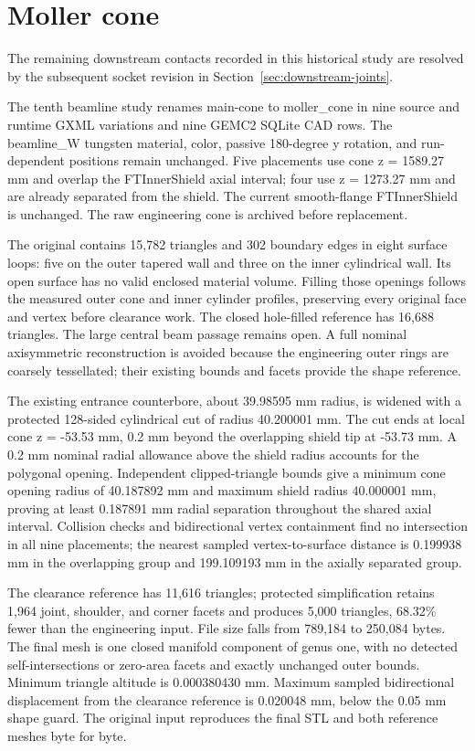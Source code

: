 \FloatBarrier
\section{Moller cone}
\label{sec:moller-cone}

The remaining downstream contacts recorded in this historical study are resolved by the subsequent socket
revision in Section~\ref{sec:downstream-joints}.

The tenth beamline study renames main-cone to moller\_cone in nine source and runtime GXML variations and
nine GEMC2 SQLite CAD rows. The beamline\_W tungsten material, color, passive 180-degree y rotation, and
run-dependent positions remain unchanged. Five placements use cone z = 1589.27 mm and overlap the
FTInnerShield axial interval; four use z = 1273.27 mm and are already separated from the shield. The current
smooth-flange FTInnerShield is unchanged. The raw engineering cone is archived before replacement.

The original contains 15,782 triangles and 302 boundary edges in eight surface loops: five on the outer
tapered wall and three on the inner cylindrical wall. Its open surface has no valid enclosed material
volume. Filling those openings follows the measured outer cone and inner cylinder profiles, preserving every
original face and vertex before clearance work. The closed hole-filled reference has 16,688 triangles. The
large central beam passage remains open. A full nominal axisymmetric reconstruction is avoided because the
engineering outer rings are coarsely tessellated; their existing bounds and facets provide the shape
reference.

The existing entrance counterbore, about 39.98595 mm radius, is widened with a protected 128-sided
cylindrical cut of radius 40.200001 mm. The cut ends at local cone z = -53.53 mm, 0.2 mm beyond the
overlapping shield tip at -53.73 mm. A 0.2 mm nominal radial allowance above the shield radius accounts for
the polygonal opening. Independent clipped-triangle bounds give a minimum cone opening radius of 40.187892
mm and maximum shield radius 40.000001 mm, proving at least 0.187891 mm radial separation throughout the
shared axial interval. Collision checks and bidirectional vertex containment find no intersection in all
nine placements; the nearest sampled vertex-to-surface distance is 0.199938 mm in the overlapping group and
199.109193 mm in the axially separated group.

The clearance reference has 11,616 triangles; protected simplification retains 1,964 joint, shoulder, and
corner facets and produces 5,000 triangles, 68.32\% fewer than the engineering input. File size falls from
789,184 to 250,084 bytes. The final mesh is one closed manifold component of genus one, with no detected
self-intersections or zero-area facets and exactly unchanged outer bounds. Minimum triangle altitude is
0.000380430 mm. Maximum sampled bidirectional displacement from the clearance reference is 0.020048 mm,
below the 0.05 mm shape guard. The original input reproduces the final STL and both reference meshes byte
for byte.

